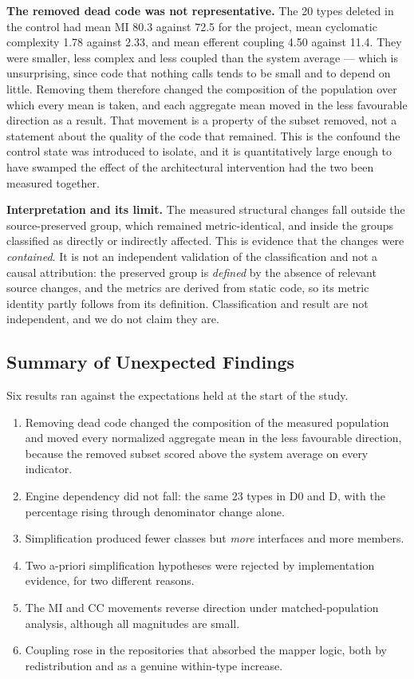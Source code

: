 \documentclass{sbc2019}%
\begin{document}
\medskip\noindent\textbf{The removed dead code was not representative.} The 20
types deleted in the control had mean MI 80.3 against 72.5 for the project, mean
cyclomatic complexity 1.78 against 2.33, and mean efferent coupling 4.50 against
11.4. They were smaller, less complex and less coupled than the system
average --- which is unsurprising, since code that nothing calls tends to be
small and to depend on little. Removing them therefore changed the composition of
the population over which every mean is taken, and each aggregate mean moved in
the less favourable direction as a result. That movement is a property of the
subset removed, not a statement about the quality of the code that remained. This
is the confound the control state was introduced to isolate, and it is quantitatively large enough to have swamped the effect of the
architectural intervention had the two been measured together.

\medskip\noindent\textbf{Interpretation and its limit.} The measured structural
changes fall outside the source-preserved group, which remained
metric-identical, and inside the groups classified as directly or indirectly
affected. This is evidence that the changes were \emph{contained}. It is not an independent validation of
the classification and not a causal attribution: the preserved group is
\emph{defined} by the absence of relevant source changes, and the metrics are
derived from static code, so its metric identity partly follows from its
definition. Classification and result are not independent, and we do not claim
they are.

\subsection{Summary of Unexpected Findings}

Six results ran against the expectations held at the start of the study.

\begin{enumerate}\itemsep2pt
\item Removing dead code changed the composition of the measured population and
moved every normalized aggregate mean in the less favourable direction, because
the removed subset scored above the system average on every indicator.
\item Engine dependency did not fall: the same 23 types in D0 and D, with the
percentage rising through denominator change alone.
\item Simplification produced fewer classes but \emph{more} interfaces and more
members.
\item Two a-priori simplification hypotheses were rejected by implementation
evidence, for two different reasons.
\item The MI and CC movements reverse direction under matched-population
analysis, although all magnitudes are small.
\item Coupling rose in the repositories that absorbed the mapper logic, both by
redistribution and as a genuine within-type increase.
\end{enumerate}
\end{document}
